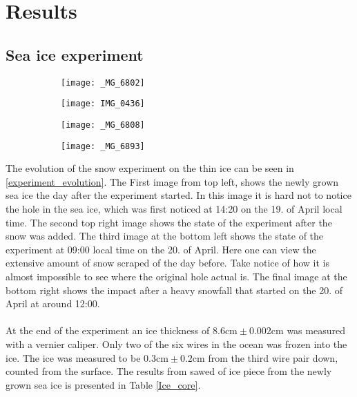 \section{Results}

\subsection{Sea ice experiment}

\begin{figure}[h!]
\centering
\caption{The evolution of the experiment from the left to the right, and from the top two images followed by the bottom.}
\label{experiment_evolution}
	\begin{subfigure}[t]{0.4\linewidth}
		\centering\texttt{[image: \_MG\_6802]}
	\end{subfigure}
	\begin{subfigure}[t]{0.4\linewidth}
		\centering\texttt{[image: IMG\_0436]}
	\end{subfigure}
	\hfill
	\begin{subfigure}[b]{0.4\linewidth}
		\centering\texttt{[image: \_MG\_6808]}
	\end{subfigure}
	\begin{subfigure}[b]{0.4\linewidth}
		\centering\texttt{[image: \_MG\_6893]}
	\end{subfigure}
\end{figure}

The evolution of the snow experiment on the thin ice can be seen in \autoref{experiment_evolution}. The First image from top left, shows the newly grown sea ice the day after the experiment started. In this image it is hard not to notice the hole in the sea ice, which was first noticed at 14:20 on the 19. of April local time. The second top right image shows the state of the experiment after the snow was added. The third image at the bottom left shows the state of the experiment at 09:00 local time on the 20. of April. Here one can view the extensive amount of snow scraped of the day before. Take notice of how it is almost impossible to see where the original hole actual is. The final image at the bottom right shows the impact after a heavy snowfall that started on the 20. of April at around 12:00.\\ 
\\
At the end of the experiment an ice thickness of $8.6 \text{cm}\pm 0.002 \text{cm}$ was measured with a vernier caliper. Only two of the six wires in the ocean was frozen into the ice. The ice was measured to be $0.3 \text{cm}\pm 0.2 \text{cm}$ from the third wire pair down, counted from the surface. The results from sawed of ice piece from the newly grown sea ice is presented in Table \autoref{Ice_core}.

